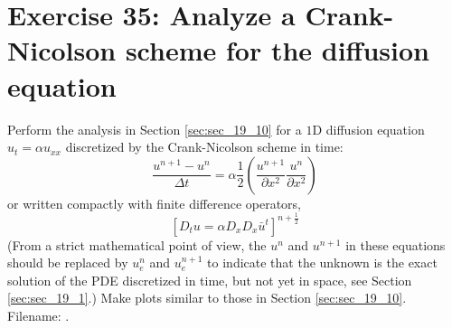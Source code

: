 \documentclass[../main.tex]{subfiles}
\begin{document}
	\section*{Exercise 35: Analyze a Crank-Nicolson scheme for the diffusion equation}		
		\noindent Perform the analysis in Section \ref{sec:sec_19_10} for a $1 \mathrm{D}$ diffusion equation $u_{t}=\alpha u_{x x}$ discretized by the Crank-Nicolson scheme in time:
		$$
		\frac{u^{n+1}-u^{n}}{\Delta t}=\alpha \frac{1}{2}\left(\frac{u^{n+1}}{\partial x^{2}} \frac{u^{n}}{\partial x^{2}}\right)
		$$
		or written compactly with finite difference operators,
		$$
		\left[D_{t} u=\alpha D_{x} D_{x} \bar{u}^{t}\right]^{n+\frac{1}{2}}
		$$
		(From a strict mathematical point of view, the $u^{n}$ and $u^{n+1}$ in these equations should be replaced by $u_{e}^{n}$ and $u_{e}^{n+1}$ to indicate that the unknown is the exact solution of the PDE discretized in time, but not yet in space, see Section \ref{sec:sec_19_1}.) Make plots similar to those in Section \ref{sec:sec_19_10}. 
		Filename: .\bigbreak



\clearpage
\end{document}
